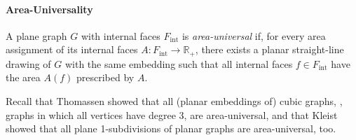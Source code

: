 \paragraph{Area-Universality}

A plane graph $G$ with internal faces $F_\text{int}$ is \emph{area-universal} if, for every area assignment of its internal faces $A \colon F_\text{int} \to \mathbb{R}_+$, there exists a planar straight-line drawing of $G$ with the same embedding such that all internal faces $f \in F_\text{int}$ have the area $A(f)$ prescribed by $A$.

Recall that Thomassen \cite{thomassen1992plane} showed that all (planar embeddings of) cubic graphs, \ie{}, graphs in which all vertices have degree 3, are area-universal, and that Kleist \cite{kleist2019planar} showed that all plane 1-subdivisions of planar graphs are area-universal, too.
